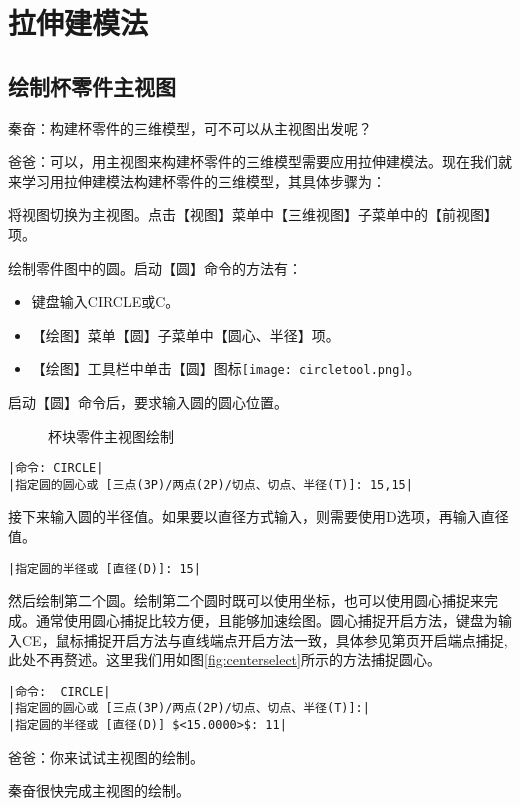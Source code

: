 \section{拉伸建模法}

\subsection{绘制杯零件主视图}
秦奋：构建杯零件的三维模型，可不可以从主视图出发呢？

爸爸：可以，用主视图来构建杯零件的三维模型需要应用拉伸建模法。现在我们就来学习用拉伸建模法构建杯零件的三维模型，其具体步骤为：

\begin{procedure}
\item 将视图切换为主视图。点击【视图】菜单中【三维视图】子菜单中的【前视图】项。
\item 绘制零件图中的圆。启动【圆】命令的方法有：
\begin{itemize}
\item 键盘输入CIRCLE或C。
\item 【绘图】菜单【圆】子菜单中【圆心、半径】项。
\item 【绘图】工具栏中单击【圆】图标\texttt{[image: circletool.png]}。
\end{itemize}
启动【圆】命令后，要求输入圆的圆心位置。
\begin{figure}[htbp]
\centering
{}\hspace{20pt}
\caption{杯块零件主视图绘制}
\end{figure}
\begin{lstlisting}
|命令: CIRCLE|
|指定圆的圆心或 [三点(3P)/两点(2P)/切点、切点、半径(T)]: 15,15|
\end{lstlisting}
接下来输入圆的半径值。如果要以直径方式输入，则需要使用D选项，再输入直径值。
\begin{lstlisting}
|指定圆的半径或 [直径(D)]: 15|
\end{lstlisting}
然后绘制第二个圆。绘制第二个圆时既可以使用坐标，也可以使用圆心捕捉来完成。通常使用圆心捕捉比较方便，且能够加速绘图。圆心捕捉开启方法，键盘为输入CE，鼠标捕捉开启方法与直线端点开启方法一致，具体参见第\pageref{fig:duixiangbuzuomen2}页开启端点捕捉,此处不再赘述。这里我们用如图\ref{fig:centerselect}所示的方法捕捉圆心。
\begin{lstlisting}
|命令:  CIRCLE|
|指定圆的圆心或 [三点(3P)/两点(2P)/切点、切点、半径(T)]:|
|指定圆的半径或 [直径(D)] $<15.0000>$: 11|
\end{lstlisting}

\end{procedure}

爸爸：你来试试主视图的绘制。

秦奋很快完成主视图的绘制。
\endinput